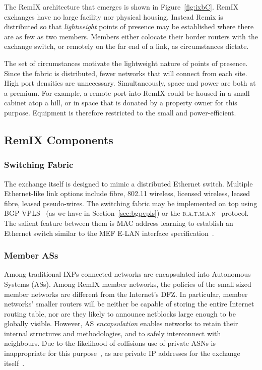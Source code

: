 The RemIX architecture that emerges is shown in Figure~\ref{fig:ixbC}. RemIX
exchanges have no large facility nor physical housing. Instead Remix is
distributed so that \emph{lightweight} points of presence may be established
where there are as few as two members. Members either colocate their border
routers with the exchange switch, or remotely on the far end of a link, as
circumstances dictate.

The set of circumstances motivate the lightweight nature of points of presence.
Since the fabric is distributed, fewer networks that will connect from each
site. High port densities are unnecessary. Simultaneously, space and power are
both at a premium. For example, a remote port into RemIX could be housed in a
small cabinet atop a hill, or in space that is donated by a property owner for
this purpose. Equipment is therefore restricted to the small and
power-efficient.


\subsection{RemIX Components}

\subsubsection{Switching Fabric}

The exchange itself is designed to mimic a distributed Ethernet switch. Multiple
Ethernet-like link options include fibre, 802.11 wireless, licensed wireless,
leased fibre, leased pseudo-wires. The switching fabric may be implemented on
top using BGP-VPLS~\cite{rfc4761} (as we have in Section~\ref{sec:bgpvpls}) or
the \textsc{b.a.t.m.a.n}~\cite{johnson2008simple} protocol. The salient feature
between them is MAC address learning to establish an Ethernet switch similar to
the \ac{MEF} E-LAN interface specification~\cite{mef62,mefes}.

\subsubsection{Member \acp{AS}}

Among traditional \acp{IXP} connected networks are encapsulated into Autonomous
Systems (\acp{AS}). Among RemIX member networks, the policies of the small sized
member networks are
different from the Internet's \ac{DFZ}. In particular, member networks' smaller
routers will be neither be capable of storing the entire Internet routing table,
nor are they likely to announce netblocks large enough to be globally visible.
However, \ac{AS} \emph{encapsulation} enables networks to retain their internal
structures and methodologies, and to safely interconnect with neighbours. Due to
the likelihood of collisions use of private \acp{ASN} is inappropriate for this
purpose~\cite{rfc6996}, as are private IP addresses for the exchange
itself~\cite{rfc1918}.

